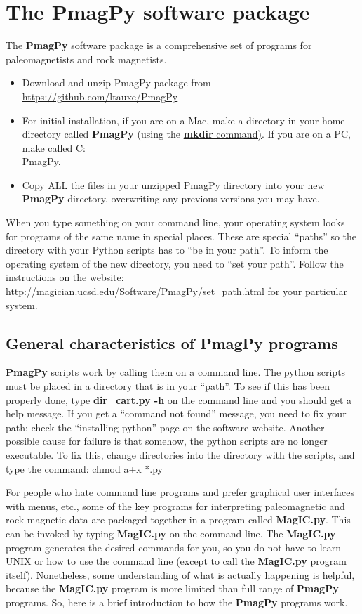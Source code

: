 \documentclass[11pt]{book}
\begin{document}
{{{\chapter{The {\bf PmagPy} software package}
\label{web:pmagpy}

The {\bf PmagPy} software package is a comprehensive set of programs for paleomagnetists and rock magnetists. 
\begin{itemize}
\item    Download and unzip PmagPy package from \url{https://github.com/ltauxe/PmagPy}
\item For initial installation, if you are on a Mac, make a directory in your home directory called {\bf PmagPy} (using the \href{#mkdir}{{\bf mkdir} command)}.  If you are on a PC, make called C:\\PmagPy.
\item Copy ALL the files in your unzipped PmagPy directory into your new {\bf PmagPy} directory, overwriting any previous versions you may have.  
\end{itemize}

When you type something on your command line, your operating system looks for programs of the same name in special places.  These are special ``paths'' so the directory with your Python scripts has to ``be in your path''.  To inform the operating system of the new directory, you need to ``set your path''.    Follow the instructions on the website:
\url{http://magician.ucsd.edu/Software/PmagPy/set_path.html} for your particular system.  


 
 \section{General characteristics of PmagPy programs}
 
{\bf PmagPy}  scripts work by calling them on a \href{#command_line}{command line}.  
 The python scripts must be placed in a directory that is in your ``path''.  To see if this has been properly done, type {\bf dir\_cart.py -h} on the command line and you should get a help message.  If you get a ``command not found'' message, you need to fix your path; check the ``installing python'' page on the software website.   Another possible cause for failure is that somehow, the python scripts are no longer executable.  To fix this, change directories into the directory with the scripts, and type the command:  chmod a+x *.py  

For people who hate command line programs and prefer graphical user interfaces with menus, etc., some of the key programs for interpreting paleomagnetic and rock magnetic data are packaged together in a program called {\bf MagIC.py}.  This can be invoked by typing {\bf MagIC.py} on the command line.  
The {\bf MagIC.py} program generates the desired commands for you, so you do not have to learn UNIX or how to use the command line (except to call the {\bf MagIC.py} program itself).  Nonetheless, some understanding of what is actually happening is helpful, because the {\bf MagIC.py} program is more limited than  full range of {\bf PmagPy} programs.  So, here is a brief introduction to how the {\bf PmagPy} programs work.

}}}
\end{document}
